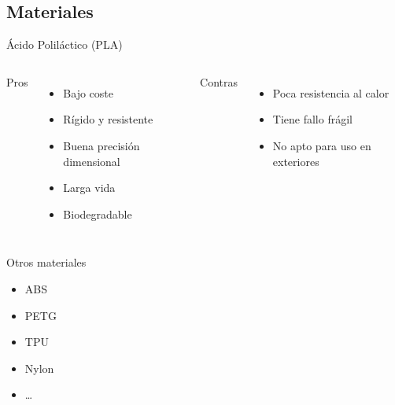 \documentclass{beamer}
\begin{document}
	\subsection{Materiales}
	\begin{frame}{Ácido Poliláctico (PLA)}
		\begin{columns}[T, onlytextwidth]
			Pros
			\begin{itemize}
				\item Bajo coste
				\item Rígido y resistente
				\item Buena precisión dimensional
				\item Larga vida
				\item Biodegradable
			\end{itemize}
			Contras
			\begin{itemize}
				\item Poca resistencia al calor
				\item Tiene fallo frágil
				\item No apto para uso en exteriores
			\end{itemize}
		\end{columns}
	\end{frame}
	\begin{frame}{Otros materiales}
		\begin{itemize}
			\item ABS
			\item PETG
			\item TPU
			\item Nylon
			\item \dots
		\end{itemize}
	\end{frame}
	
\end{document}
